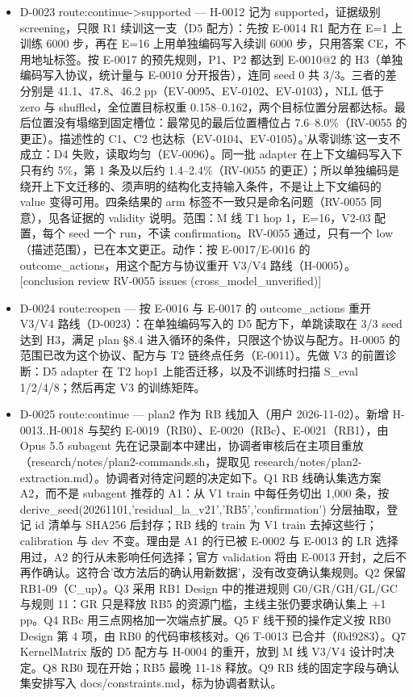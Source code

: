 \documentclass[11pt]{article}
\begin{document}
\begin{itemize}
\item D-0023 route:continue-\textgreater{}supported --- H-0012 记为 supported，证据级别 screening，只限 R1 续训这一支（D5 配方）：先按 E-0014 R1 配方在 E=1 上训练 6000 步，再在 E=16 上用单独编码写入续训 6000 步，只用答案 CE，不用地址标签。按 E-0017 的预先规则，P1、P2 都达到 E-0010@2 的 H3（单独编码写入协议，统计量与 E-0010 分开报告），连同 seed 0 共 3/3。三者的差分别是 41.1、47.8、46.2 pp（EV-0095、EV-0102、EV-0103），NLL 低于 zero 与 shuffled，全位置目标权重 0.158--0.162，两个目标位置分层都达标。最后位置没有塌缩到固定槽位：最常见的最后位置槽位占 7.6--8.0\%（RV-0055 的更正）。描述性的 C1、C2 也达标（EV-0104、EV-0105）。'从零训练'这一支不成立：D4 失败，读取均匀（EV-0096）。同一批 adapter 在上下文编码写入下只有约 5\%，第 1 条及以后约 1.4--2.4\%（RV-0055 的更正）；所以单独编码是绕开上下文迁移的、须声明的结构化支持输入条件，不是让上下文编码的 value 变得可用。四条结果的 arm 标签不一致只是命名问题（RV-0055 同意），见各证据的 validity 说明。范围：M 线 T1 hop 1，E=16，V2-03 配置，每个 seed 一个 run，不读 confirmation。RV-0055 通过，只有一个 low（描述范围），已在本文更正。动作：按 E-0017/E-0016 的 outcome\_actions，用这个配方与协议重开 V3/V4 路线（H-0005）。 [conclusion review RV-0055 issues (cross\_model\_unverified)]
\item D-0024 route:reopen --- 按 E-0016 与 E-0017 的 outcome\_actions 重开 V3/V4 路线（D-0023）：在单独编码写入的 D5 配方下，单跳读取在 3/3 seed 达到 H3，满足 plan §8.4 进入循环的条件，只限这个协议与配方。H-0005 的范围已改为这个协议、配方与 T2 链终点任务（E-0011）。先做 V3 的前置诊断：D5 adapter 在 T2 hop1 上能否迁移，以及不训练时扫描 S\_eval 1/2/4/8；然后再定 V3 的训练矩阵。
\item D-0025 route:continue --- plan2 作为 RB 线加入（用户 2026-11-02）。新增 H-0013..H-0018 与契约 E-0019（RB0）、E-0020（RBc）、E-0021（RB1），由 Opus 5.5 subagent 先在记录副本中建出，协调者审核后在主项目重放（research/notes/plan2-commands.sh，提取见 research/notes/plan2-extraction.md）。协调者对待定问题的决定如下。Q1 RB 线确认集选方案 A2，而不是 subagent 推荐的 A1：从 V1 train 中每任务切出 1,000 条，按 derive\_seed(20261101,'residual\_la\_v21','RB5','confirmation') 分层抽取，登记 id 清单与 SHA256 后封存；RB 线的 train 为 V1 train 去掉这些行；calibration 与 dev 不变。理由是 A1 的行已被 E-0002 与 E-0013 的 LR 选择用过，A2 的行从未影响任何选择；官方 validation 将由 E-0013 开封，之后不再作确认。这符合'改方法后的确认用新数据'，没有改变确认集规则。Q2 保留 RB1-09（C\_up）。Q3 采用 RB1 Design 中的推进规则 G0/GR/GH/GL/GC 与规则 11：GR 只是释放 RB5 的资源门槛，主线主张仍要求确认集上 +1 pp。Q4 RBc 用三点网格加一次端点扩展。Q5 F 线干预的操作定义按 RB0 Design 第 4 项，由 RB0 的代码审核核对。Q6 T-0013 已合并（f0d9283）。Q7 KernelMatrix 版的 D5 配方与 H-0004 的重开，放到 M 线 V3/V4 设计时决定。Q8 RB0 现在开始；RB5 最晚 11-18 释放。Q9 RB 线的固定字段与确认集安排写入 docs/constraints.md，标为协调者默认。

\end{itemize}
\end{document}
